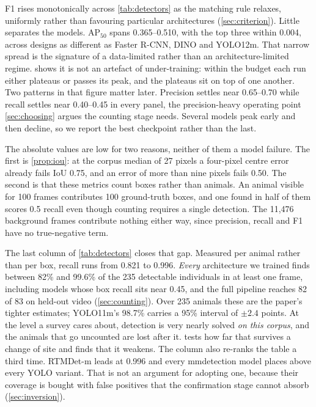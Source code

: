 F1 rises monotonically across \cref{tab:detectors} as the matching rule relaxes, uniformly
rather than favouring particular architectures (\cref{sec:criterion}). Little separates the
models. AP$_{50}$ spans 0.365--0.510, with the top three within 0.004, across designs as
different as Faster R-CNN, DINO and YOLO12m. That narrow spread is the signature of a
data-limited rather than an architecture-limited regime.  shows it is
not an artefact of under-training: within the budget each run either plateaus or passes
its peak, and the plateaus sit on top of one another. Two patterns in that figure matter
later. Precision settles near 0.65--0.70 while recall settles near 0.40--0.45 in every
panel, the precision-heavy operating point \cref{sec:choosing} argues the counting stage
needs. Several models peak early and then decline, so we report the best checkpoint rather
than the last.

The absolute values are low for two reasons, neither of them a model failure. The first is
\cref{prop:iou}: at the corpus median of 27 pixels a four-pixel centre error already fails
IoU 0.75, and an error of more than nine pixels fails 0.50. The second is that these
metrics count boxes rather than animals. An animal visible for 100 frames contributes 100
ground-truth boxes, and one found in half of them scores 0.5 recall even though counting
requires a single detection. The 11,476 background frames contribute nothing either way,
since precision, recall and F1 have no true-negative term.

The last column of \cref{tab:detectors} closes that gap. Measured per animal rather than
per box, recall runs from 0.821 to 0.996. \emph{Every} architecture we trained finds between
82\% and 99.6\% of the 235 detectable individuals in at least one frame, including models
whose box recall sits near 0.45, and the full pipeline reaches 82 of 83 on held-out video
(\cref{sec:counting}). Over 235 animals these are the paper's tighter estimates; YOLO11m's
98.7\% carries a 95\% interval of $\pm2.4$ points. At the level a survey cares about,
detection is very nearly solved \emph{on this corpus}, and the animals that go uncounted are
lost after it.  tests how far that survives a change of site and finds that
it weakens. The column also re-ranks the table a third time. RTMDet-m leads at 0.996 and
every mmdetection model places above every YOLO variant. That is not an argument for
adopting one, because their coverage is bought with false positives that the confirmation
stage cannot absorb (\cref{sec:inversion}).

